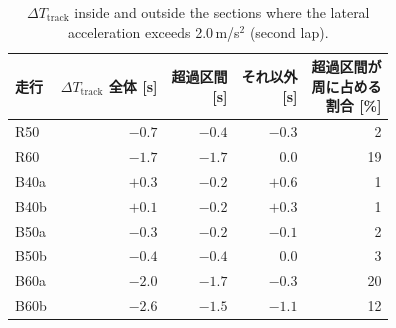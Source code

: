 \begin{table}[!htbp]
  \centering
  \caption{$\Delta T_{\mathrm{track}}$ inside and outside the sections where the lateral acceleration exceeds 2.0\,m/s$^2$ (second lap).}
  \label{tab:track_overlap}
  \small
  \begin{lrbox}{\tblbox}\begin{tabular}{lrrrr}
    \toprule
    走行 & \shortstack[r]{$\Delta T_{\mathrm{track}}$\\全体 {[s]}} & \shortstack[r]{超過区間\\{[s]}} & \shortstack[r]{それ以外\\{[s]}} & \shortstack[r]{超過区間が\\周に占める\\割合 {[\%]}} \\
    \midrule
    R50 & $-0.7$ & $-0.4$ & $-0.3$ & 2 \\
    R60 & $-1.7$ & $-1.7$ & 0.0 & 19 \\
    B40a & $+0.3$ & $-0.2$ & $+0.6$ & 1 \\
    B40b & $+0.1$ & $-0.2$ & $+0.3$ & 1 \\
    B50a & $-0.3$ & $-0.2$ & $-0.1$ & 2 \\
    B50b & $-0.4$ & $-0.4$ & 0.0 & 3 \\
    B60a & $-2.0$ & $-1.7$ & $-0.3$ & 20 \\
    B60b & $-2.6$ & $-1.5$ & $-1.1$ & 12 \\
    \bottomrule
  \end{tabular}\end{lrbox}\usebox{\tblbox}
\end{table}

